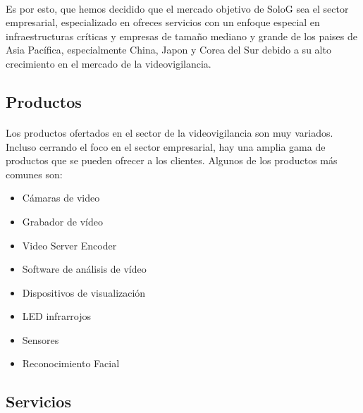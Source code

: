\documentclass{report}
\begin{document}
        \paragraph{}{
          Es por esto, que hemos decidido que el mercado objetivo de SoloG sea el sector empresarial, especializado en ofreces servicios con un enfoque especial en infraestructuras críticas y empresas de tamaño mediano y grande de los paises de Asia Pacífica, especialmente China, Japon y Corea del Sur debido a su alto crecimiento en el mercado de la videovigilancia.
        }
        \subsection*{Productos}
          \paragraph*{}
          {
            Los productos ofertados en el sector de la videovigilancia son muy variados.
            Incluso cerrando el foco en el sector empresarial, hay una amplia gama de productos que se pueden ofrecer a los clientes.
            Algunos de los productos más comunes son: \cite{wiki-videovigilancia-ip} \cite{illustra-cameras} \cite{prosegur-aiot}
          }
          \begin{multicols}{2}
            \begin{itemize}
              \item Cámaras de video
              \item Grabador de vídeo 
              \item Video Server Encoder
              \item Software de análisis de vídeo
              \item Dispositivos de visualización
              \item LED infrarrojos
              \item Sensores
              \item Reconocimiento Facial
            \end{itemize}
          \end{multicols}
        \subsection*{Servicios}
\end{document}
